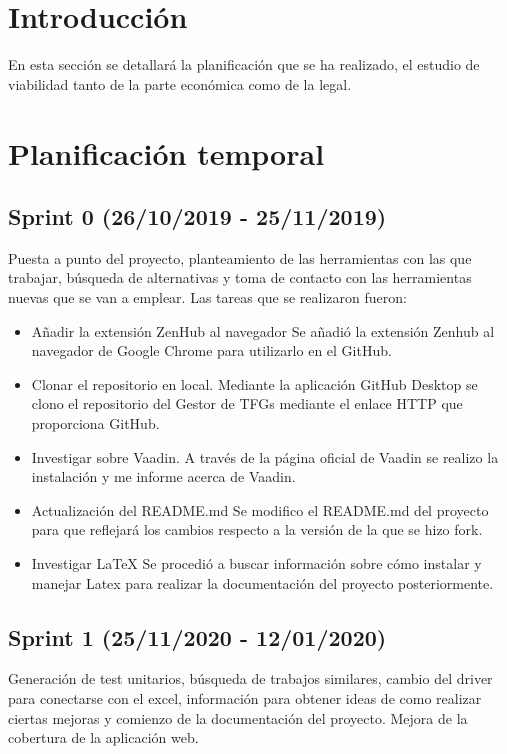 
\section{Introducción}
En esta sección se detallará la planificación que se ha realizado, el estudio de viabilidad tanto de la parte económica como de la legal.

\section{Planificación temporal}
\subsection{Sprint 0 (26/10/2019 - 25/11/2019)}
Puesta a punto del proyecto, planteamiento de las herramientas con las que trabajar, búsqueda de alternativas y toma de contacto con las herramientas nuevas que se van a emplear.
Las tareas que se realizaron fueron:
\begin{itemize}
	\tightlist
	\item Añadir la extensión ZenHub al navegador
		Se añadió la extensión Zenhub al navegador de Google Chrome para utilizarlo en el GitHub.
	\item Clonar el repositorio en local. 
		Mediante la aplicación GitHub Desktop se clono el repositorio del Gestor de TFGs mediante el enlace HTTP que proporciona GitHub.
	\item Investigar sobre Vaadin.
		A través de la página oficial de Vaadin se realizo la instalación y me informe acerca de Vaadin.
	\item Actualización del README.md 
		Se modifico el README.md del proyecto para que reflejará los cambios respecto a la versión de la que se hizo fork. 
	\item Investigar LaTeX
		Se procedió a buscar información sobre cómo instalar y manejar Latex para realizar la documentación del proyecto posteriormente.
\end{itemize}

\subsection{Sprint 1 (25/11/2020 - 12/01/2020)}
Generación de test unitarios, búsqueda de trabajos similares, cambio del driver para conectarse con el excel, información para obtener ideas de como realizar ciertas mejoras y comienzo de la documentación del proyecto. Mejora de la cobertura de la aplicación web.

